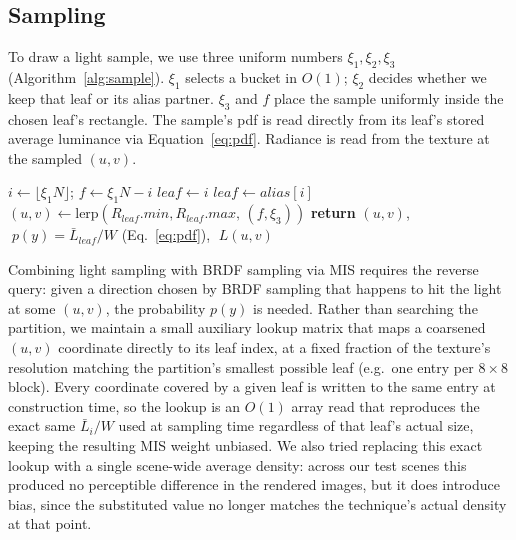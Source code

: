 \documentclass[acmtog,review,anonymous]{acmart}
\begin{document}
\subsection{Sampling}
\label{sec:sampling}
To draw a light sample, we use three uniform numbers $\xi_1,\xi_2,\xi_3$
(Algorithm~\ref{alg:sample}). $\xi_1$ selects a bucket in $O(1)$; 
$\xi_2$ decides whether we keep that leaf or its
alias partner.
$\xi_3$ and $f$ place the sample uniformly
inside the chosen leaf's rectangle. The sample's pdf is read directly from its
leaf's stored average luminance via Equation~\ref{eq:pdf}. Radiance is read from the texture at the sampled $(u,v)$.

\begin{algorithm}[h]
\caption{Draw one light sample}
\label{alg:sample}
\begin{algorithmic}[1]
\STATE $i \leftarrow \lfloor \xi_1 N \rfloor$; \quad $f \leftarrow \xi_1 N - i$
  \STATE $\mathit{leaf} \leftarrow i$
\ELSE
  \STATE $\mathit{leaf} \leftarrow \mathit{alias}[i]$
\ENDIF
\STATE $(u,v) \leftarrow \text{lerp}(R_{\mathit{leaf}}.\mathit{min}, R_{\mathit{leaf}}.\mathit{max},\, (f,\xi_3))$
\STATE \textbf{return} $(u,v)$, $\;p(y){=}\bar{L}_{\mathit{leaf}}/W$ (Eq.~\ref{eq:pdf}), $\;L(u,v)$
\end{algorithmic}
\end{algorithm}

Combining light sampling with BRDF sampling via MIS requires the
reverse query: given a direction chosen by BRDF sampling that happens to hit the light at
some $(u,v)$, the probability $p(y)$ is needed. Rather than searching the partition, we
maintain a small auxiliary lookup matrix that maps a coarsened $(u,v)$ coordinate directly to
its leaf index, at a fixed fraction of the texture's resolution matching the partition's
smallest possible leaf (e.g.\ one entry per $8{\times}8$ block). 
Every coordinate covered by a given leaf is written to the same entry at
construction time, so the lookup is an $O(1)$ array read that reproduces the exact same
$\bar{L}_i/W$ used at sampling time regardless of that leaf's actual size, keeping the
resulting MIS weight unbiased. We also tried replacing this exact lookup with a single
scene-wide average density: across our test scenes this produced no perceptible difference
in the rendered images, but it does introduce bias, since the substituted value no longer
matches the technique's actual density at that point. 
\end{document}
